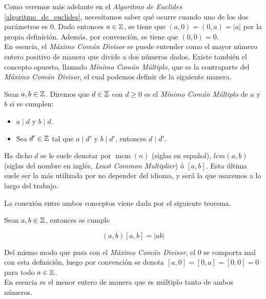 Como veremos más adelante en el \textit{Algoritmo de Euclides} \ref{algoritmo_de_euclides}, necesitamos saber qué ocurre cuando uno de los dos parámetros es $0$. Dado entonces $a \in \mathbb{Z}$, se tiene que $(a, 0) = (0, a) = |a|$ por la propia definición. Además, por convención, se tiene que $(0, 0) = 0$.\\

En esencia, el \textit{Máximo Común Divisor} se puede entender como el mayor número entero positivo de manera que divide a dos números dados. Existe también el concepto opuesto, llamado \textit{Mínimo Común Múltiplo}, que es la contraparte del \textit{Máximo Común Divisor}, el cual podemos definir de la siguiente manera.

\begin{definicion}
	Sean $a, b \in \mathbb{Z}$. Diremos que $d \in \mathbb{Z}$ con $d \geq 0$ es el \textit{Mínimo Común Múltiplo} de $a$ y $b$ si se cumplen:
	
	\begin{itemize}
		\item $a \mid d$ y $b \mid d$.
		
		\item Sea $d' \in \mathbb{Z}$ tal que $a \mid d'$ y $b \mid d'$, entonces $d \mid d'$.
	\end{itemize} 
	
	Ha dicho $d$ se le suele denotar por $\mathop{mcm}(n)$ (siglas en español), $lcm(a, b)$ (siglas del nombre en inglés, \textit{Least Common Multiplier}) ó $[a, b]$. Esta última suele ser la más utilizada por no depender del idioma, y será la que usaremos a lo largo del trabajo.
\end{definicion}

La conexión entre ambos conceptos viene dada por el siguiente teorema.

\begin{teorema}\label{}
	Sean $a, b \in \mathbb{Z}$, entonces se cumple
	
	\begin{equation}
	(a, b)[a, b] = |ab|
	\end{equation}
\end{teorema}

Del mismo modo que pasa con el \textit{Máximo Común Divisor}, el $0$ se comporta mal con esta definición, luego por convención se denota $[a, 0] = [0, a] = [0, 0] = 0$ para todo $a \in \mathbb{Z}$.\\

En esencia es el menor entero de manera que es múltiplo tanto de ambos números.\\

